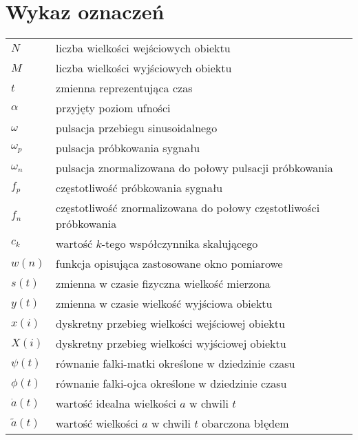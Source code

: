 \chapter*{Wykaz oznaczeń}

\begin{longtable}[l]{ l @{~~--~~} p{376pt} }
$N$                             & liczba wielkości wejściowych obiektu \\
$M$                             & liczba wielkości wyjściowych obiektu \\
$t$                             & zmienna reprezentująca czas \\
$\alpha$                        & przyjęty poziom ufności \\
$\omega$                        & pulsacja przebiegu sinusoidalnego \\
$\omega_{p}$                    & pulsacja próbkowania sygnału \\
$\omega_{n}$                    & pulsacja znormalizowana do połowy pulsacji próbkowania \\
$f_{p}$                         & częstotliwość próbkowania sygnału \\
$f_{n}$                         & częstotliwość znormalizowana do połowy częstotliwości próbkowania \\
$c_{k}$                         & wartość $k$-tego współczynnika skalującego \\
$w(n)$                          & funkcja opisująca zastosowane okno pomiarowe \\
$s(t)$                          & zmienna w czasie fizyczna wielkość mierzona \\
$y(t)$                          & zmienna w czasie wielkość wyjściowa obiektu \\
$x(i)$                          & dyskretny przebieg wielkości wejściowej obiektu \\
$X(i)$                          & dyskretny przebieg wielkości wyjściowej obiektu \\
$\psi(t)$                       & równanie falki-matki określone w dziedzinie czasu \\
$\phi(t)$                       & równanie falki-ojca określone w dziedzinie czasu \\
$\dot{a}(t)$                    & wartość idealna wielkości $a$ w chwili $t$ \\
$\tilde{a}(t)$                  & wartość wielkości $a$ w chwili $t$ obarczona błędem \\

\end{longtable}
